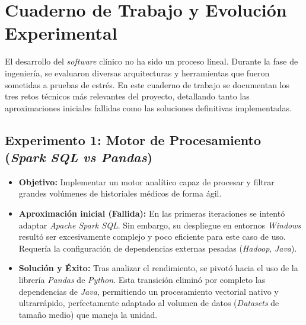 \section{Cuaderno de Trabajo y Evolución Experimental}
El desarrollo del \textit{software} clínico no ha sido un proceso lineal. Durante la fase de ingeniería, se evaluaron diversas arquitecturas y herramientas que fueron sometidas a pruebas de estrés. En este cuaderno de trabajo se documentan los tres retos técnicos más relevantes del proyecto, detallando tanto las aproximaciones iniciales fallidas como las soluciones definitivas implementadas.

\subsection{Experimento 1: Motor de Procesamiento (\textit{Spark SQL vs Pandas})}
\begin{itemize}
    \item \textbf{Objetivo:} Implementar un motor analítico capaz de procesar y filtrar grandes volúmenes de historiales médicos de forma ágil.
    \item \textbf{Aproximación inicial (Fallida):} En las primeras iteraciones se intentó adaptar \textit{Apache Spark SQL}. Sin embargo, su despliegue en entornos \textit{Windows} resultó ser excesivamente complejo y poco eficiente para este caso de uso. Requería la configuración de dependencias externas pesadas (\textit{Hadoop}, \textit{Java}).
    \item \textbf{Solución y Éxito:} Tras analizar el rendimiento, se pivotó hacia el uso de la librería \textit{Pandas} de \textit{Python}. Esta transición eliminó por completo las dependencias de \textit{Java}, permitiendo un procesamiento vectorial nativo y ultrarrápido, perfectamente adaptado al volumen de datos (\textit{Datasets} de tamaño medio) que maneja la unidad.
\end{itemize}

